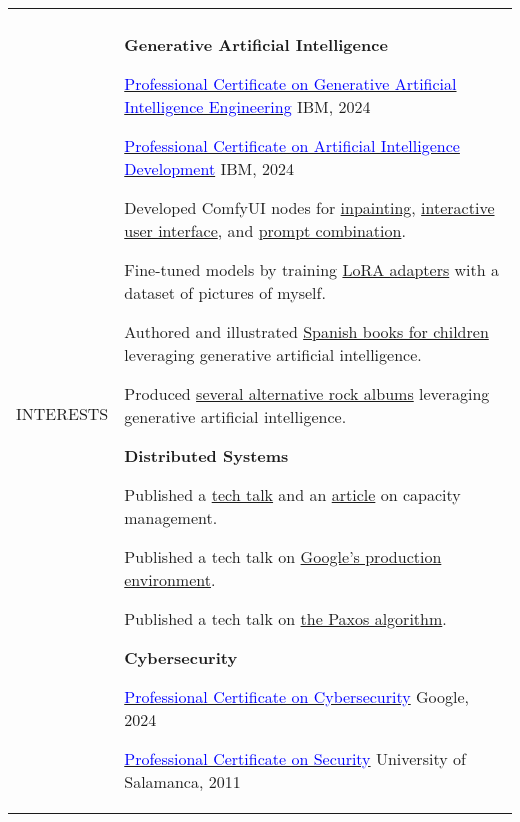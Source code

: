 \documentclass[letterpaper,10pt,oneside]{article}
\newcommand{\DatestampY}[1]{#1}
\newcommand{\itemspacingtwo}{\vspace{0.08cm}}
\newcommand{\sref}[2]{%
    \href{https://0/local/attachments/#1}{\textcolor{blue}{#2}}%
}
\newenvironment{body}
{\par\par
\begin{longtable}{p{0.145\textwidth}p{0.81\textwidth}}}
{\par\end{longtable}\par}
\renewcommand{\section}[3]{\\[-0.35cm]\pdfbookmark[2]{#2}{#3}\\%
\raggedleft  %
{\fontsize{9.5pt}{9.5pt}\selectfont\bfseries\raggedright%
\MakeUppercase{#1}}&}
\begin{document}
\begin{body}
\section{Interests}{Interests}{PDF:Interests}
\textbf{Generative Artificial Intelligence}
\begin{comp}
\item \sref{Certificate-Coursera-IBM-GenerativeAIEngineering.pdf}{Professional Certificate on Generative Artificial Intelligence Engineering} \textemdash{ }IBM, \DatestampY{2024}
\item \sref{Certificate-Coursera-IBM-AIDeveloper.pdf}{Professional Certificate on Artificial Intelligence Development} \textemdash{ }IBM, \DatestampY{2024}
\item Developed ComfyUI nodes for \href{https://github.com/lquesada/ComfyUI-Inpaint-CropAndStitch}{inpainting}, \href{https://github.com/lquesada/ComfyUI-Interactive}{interactive user interface}, and \href{https://github.com/lquesada/ComfyUI-Prompt-Combinator}{prompt combination}.
\item Fine-tuned models by training \href{https://github.com/lquesada/luis-genai-pictures/}{LoRA adapters} with a dataset of pictures of myself.
\item Authored and illustrated \href{https://www.amazon.es/dp/B0C4DVR9N5}{Spanish books for children} leveraging generative artificial intelligence.
\item Produced \href{https://open.spotify.com/artist/6GdiI8ZKeWhSY73WWOhbep/discography/all}{several alternative rock albums} leveraging generative artificial intelligence.
\end{comp}
\itemspacingtwo

\textbf{Distributed Systems}
\begin{comp}
\item Published a \href{https://youtu.be/pOo0oKNM9I8}{tech talk} and an \href{https://static.googleusercontent.com/media/sre.google/en//static/pdf/login_winter20_10_torres.pdf}{article} on capacity management.
\item Published a tech talk on \href{https://youtu.be/dhTVVWzpc4Q}{Google's production environment}.
\item Published a tech talk on \href{https://youtu.be/d7nAGI_NZPk}{the Paxos algorithm}.
\end{comp}
\itemspacingtwo

\textbf{Cybersecurity}
\begin{comp}
\item \sref{Certificate-Coursera-Google-Cybersecurity.pdf}{Professional Certificate on Cybersecurity} \textemdash{ }Google, \DatestampY{2024}
\item \sref{Certificate-Certyred.pdf}{Professional Certificate on Security} \textemdash{ }University of Salamanca, \DatestampY{2011}
\end{comp}
\itemspacingtwo


\end{body}
\end{document}
